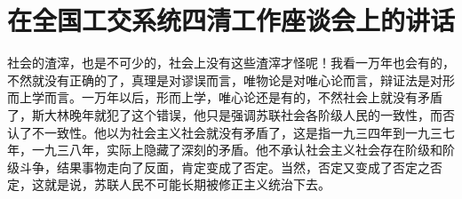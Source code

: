 \section[在全国工交系统四清工作座谈会上的讲话（一九六五年七月二十日）]{在全国工交系统四清工作座谈会上的讲话}


社会的渣滓，也是不可少的，社会上没有这些渣滓才怪呢！我看一万年也会有的，不然就没有正确的了，真理是对谬误而言，唯物论是对唯心论而言，辩证法是对形而上学而言。一万年以后，形而上学，唯心论还是有的，不然社会上就没有矛盾了，斯大林晚年就犯了这个错误，他只是强调苏联社会各阶级人民的一致性，而否认了不一致性。他以为社会主义社会就没有矛盾了，这是指一九三四年到一九三七年，一九三八年，实际上隐藏了深刻的矛盾。他不承认社会主义社会存在阶级和阶级斗争，结果事物走向了反面，肯定变成了否定。当然，否定又变成了否定之否定，这就是说，苏联人民不可能长期被修正主义统治下去。

